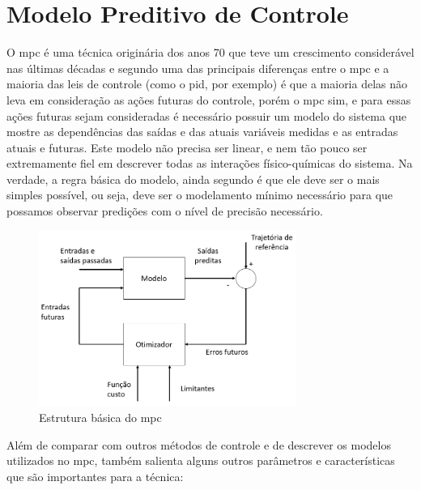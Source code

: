 \chapter{Modelo Preditivo de Controle}
\label{ch:mpc}

O \acrshort{mpc} é uma técnica originária dos anos 70 que teve um crescimento considerável nas últimas
décadas \cite{Camacho2007} e segundo  uma das principais diferenças entre o
\acrshort{mpc} e a maioria das leis de controle (como o \acrshort{pid}, por exemplo) é que a maioria
delas não leva em consideração as ações futuras do controle, porém o \acrshort{mpc} sim, e para essas
ações futuras sejam consideradas é necessário possuir um modelo do sistema que mostre as dependências
das saídas e das atuais variáveis medidas e as entradas atuais e futuras. %
Este modelo não precisa ser linear, e nem tão pouco ser extremamente fiel em descrever todas as interações
físico-químicas do sistema. Na verdade, a regra básica do modelo, ainda segundo 
é que ele deve ser o mais simples possível, ou seja, deve ser o modelamento mínimo necessário para que
possamos observar predições com o nível de precisão necessário.

\begin{figure}[h]
	\begin{center}
		\includegraphics[width=0.75\textwidth]{./5_images/fig_mpc_basic_structure.png} 
		\caption{Estrutura básica do \acrshort{mpc}}
		\label{fig:mpc_basic_structure}
	\end{center}
\end{figure}

Além de comparar com outros métodos de controle e de descrever os modelos utilizados no \acrshort{mpc},
 também salienta alguns outros parâmetros e características que são importantes
para a técnica:

